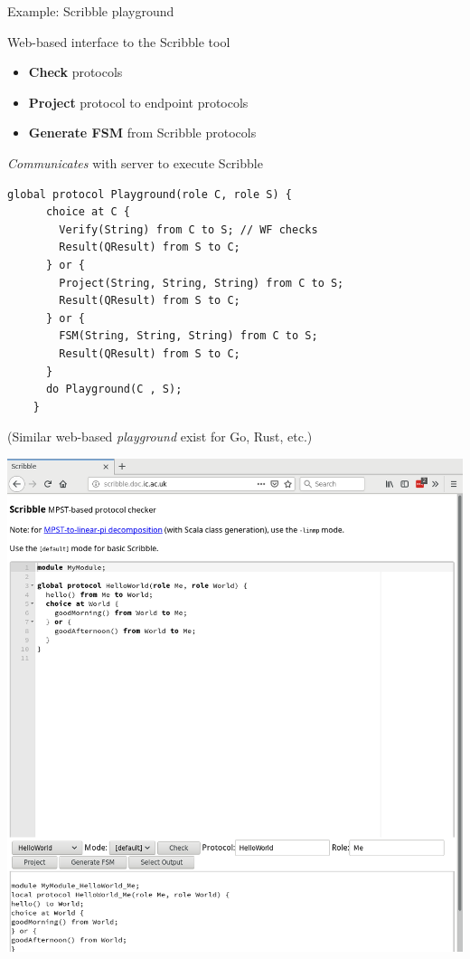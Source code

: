 \documentclass[aspectratio=1610]{beamer}
\begin{document}
\begin{frame}[fragile]{Example: Scribble playground}
  \begin{minipage}{0.55\linewidth}
    Web-based interface to the Scribble tool
    \begin{itemize}
      \item \textbf{Check} protocols
      \item \textbf{Project} protocol to endpoint protocols
      \item \textbf{Generate FSM} from Scribble protocols
    \end{itemize}
    \vspace{3ex}
    \textit{Communicates} with server to execute Scribble
    \begin{lstlisting}[language=Scribble,style=Scribble,basicstyle=\tiny\ttfamily]
    global protocol Playground(role C, role S) {
      choice at C {
        Verify(String) from C to S; // WF checks
        Result(QResult) from S to C;
      } or {
        Project(String, String, String) from C to S;
        Result(QResult) from S to C;
      } or {
        FSM(String, String, String) from C to S;
        Result(QResult) from S to C;
      }
      do Playground(C , S);
    }
    \end{lstlisting}
    {\footnotesize (Similar web-based \textit{playground} exist for Go, Rust, etc.)}
  \end{minipage}
  \begin{minipage}{0.43\linewidth}
    \quad
    \includegraphics[width=\linewidth]{scribble-playground}
  \end{minipage}
\end{frame}
\end{document}
